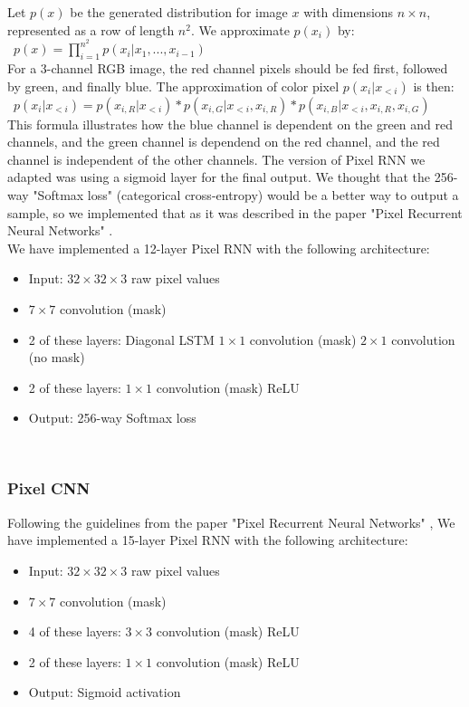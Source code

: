 \documentclass[10pt,twocolumn,letterpaper]{article}
\begin{document}
Let $p(x)$ be the generated distribution for image $x$ with dimensions $n \times n$, represented as a row of length $n^2$. We approximate $p(x_i)$ by: \\
\
$p(x) = \prod_{i=1}^{n^2} p(x_i | x_1, ... , x_{i-1} )$ \\

For a 3-channel RGB image, the red channel pixels should be fed first, followed by green, and finally blue. The approximation of color pixel $p(x_i | x_{<i})$ is then: \\
\
$p(x_i | x_{<i}) = p(x_{i,R} | x_{<i}) * p(x_{i,G} | x_{<i}, x_{i,R}) * p(x_{i,B} | x_{<i}, x_{i,R}, x_{i,G}) $ \\

This formula illustrates how the blue channel is dependent on the green and red channels, and the green channel is dependend on the red channel, and the red channel is independent of the other channels. The version of Pixel RNN we adapted was using a sigmoid layer for the final output. We thought that the 256-way "Softmax loss" (categorical cross-entropy) would be a better way to output a sample, so we implemented that as it was described in the paper "Pixel Recurrent Neural Networks" \cite{pixelRNN}. \\

We have implemented a 12-layer Pixel RNN with the following architecture: 
\begin{itemize}
\item Input: $32  \times  32  \times  3$ raw pixel values
\item $7 \times 7$ convolution (mask)
\item 2 of these layers:
\subitem Diagonal LSTM
\subsubitem $1 \times 1$ convolution (mask)
\subsubitem $2 \times 1$ convolution (no mask)
\item 2 of these layers:
\subitem $1  \times  1$ convolution (mask)
\subitem ReLU
\item Output: 256-way Softmax loss
\end{itemize}
\

\subsubsection{Pixel CNN}
Following the guidelines from the paper "Pixel Recurrent Neural Networks" \cite{pixelRNN}, We have implemented a 15-layer Pixel RNN with the following architecture: 
\begin{itemize}
\item Input: $32  \times  32  \times  3$ raw pixel values
\item $7 \times 7$ convolution (mask)
\item 4 of these layers:
\subitem $3 \times 3$ convolution (mask)
\subitem ReLU
\item 2 of these layers:
\subitem $1 \times 1$ convolution (mask)
\subitem ReLU
\item Output: Sigmoid activation
\end{itemize}
\
\end{document}
